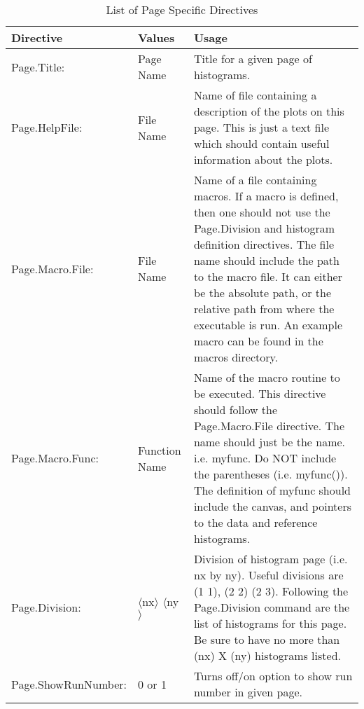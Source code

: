 \documentclass[12pt]{article}
\begin{document}
\begin{table}
\begin{tabular}{llp{}}
\hline\hline
Directive & Values & Usage \\ \hline
Page.Title: &  Page Name & Title for a given page of histograms.\\
Page.HelpFile: & File Name & Name of file containing a description of the 
                             plots on this page. This is just a text file 
                             which should contain useful information about 
                             the plots.\\
Page.Macro.File: & File Name & 
        Name of a file containing macros. If a macro is defined, then
        one should not use the Page.Division and histogram definition
        directives. The file name should include the path to the macro file.
        It can
        either be the absolute path, or the relative path from where
        the executable is run. 
        An example macro can be found in the macros directory.\\
Page.Macro.Func: & Function Name & 
        Name of the macro routine to be executed. This directive should
        follow the Page.Macro.File directive. The name should just be the name.
        i.e. myfunc. Do NOT include the parentheses (i.e. myfunc()). The 
        definition of myfunc should include the canvas, and pointers to the 
        data and reference histograms. \\
Page.Division: & $\langle$nx$\rangle$ $\langle$ny$\rangle$ &
       Division of histogram page (i.e. nx by ny).
       Useful divisions are (1 1), (2 2) (2 3).
       Following the Page.Division command are the list of
        histograms for this page. Be sure to have no more than
        (nx) X (ny) histograms listed.\\
Page.ShowRunNumber: & 0 or 1 &
       Turns off/on option to show run number in given page.\\
\hline
\end{tabular}
\caption{List of Page Specific Directives}
\label{tab:page}
\end{table}
\end{document}
